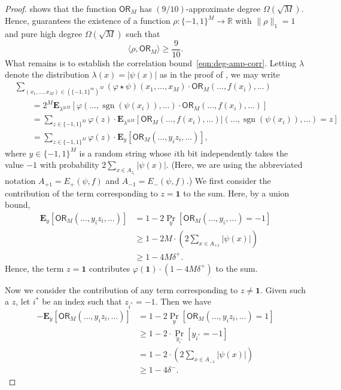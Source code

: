 \documentclass[11pt, letterpaper, fleqn]{article}
\theoremstyle{plain}
\newcommand{\R}{\mathbb{R}}
\newcommand{\sgn}{\mathrm{sign}}
\newcommand{\OR}{\mathsf{ OR}}
\newcommand{\bits}{\{-1,1\}}
\newcommand{\ls}{\star}
\renewcommand{\sgn}{\operatorname{sgn}}
\begin{document}
\begin{proof}

 shows that the function $\OR_M$ has $(9/10)$-approximate degree $\Omega(\sqrt{M})$. Hence,  guarantees the existence of a function $\rho : \bits^M \to \R$ with $\|\rho\|_1 = 1$ and pure high degree $\Omega(\sqrt{M})$ such that
\begin{equation}
\langle \rho, \OR_M \rangle \ge \frac{9}{10}.
\end{equation}
What remains is to establish the correlation bound~\eqref{eqn:deg-amp-corr}. Letting $\lambda$ denote the distribution $\lambda(x) = |\psi(x)|$ as in the proof of , we may write
\begin{align}
& \sum_{(x_1, \dots, x_{M}) \in (\bits^m)^M} (\varphi \ls \psi) (x_1, \dots, x_M) \cdot \OR_M(\dots, f(x_i), \dots) \nonumber \\
&\qquad= 2^{M} \mathbf{E}_{\lambda^{\otimes M}} [\varphi( \dots, \sgn(\psi(x_i)), \dots) \cdot \OR_M\left( \dots, f(x_i), \dots\right)] \nonumber\\
&\qquad= \sum_{z \in \bits^M} \varphi(z) \cdot \mathbf{E}_{\lambda^{\otimes M}} [\OR_M(\dots, f(x_i), \dots) | (\dots, \sgn(\psi(x_i)), \dots) = z] \nonumber\\
&\qquad = \sum_{z \in \bits^M} \varphi(z) \cdot \mathbf{E}_{y} [\OR_M(\dots, y_i z_i, \dots)], \label{eqn:deg-amp-middle}
\end{align}
where $y \in \bits^M$ is a random string whose $i$th bit independently takes the value $-1$ with probability $2 \sum_{x \in A_{z_i}} |\psi(x)|$. (Here, we are using the abbreviated notation $A_{+1} = E_+(\psi, f)$ and $A_{-1} = E_-(\psi, f)$.) We first consider the contribution of the term corresponding to $z = \mathbf{1}$ to the sum. Here, by a union bound,
\begin{align*}
\mathbf{E}_{y} [\OR_M(\dots, y_i z_i, \dots)] &= 1 - 2 \Pr_y[\OR_M(\dots, y_i, \dots) = -1] \\
&\ge 1 - 2 M \cdot \left(2 \sum_{x \in A_{+1}} |\psi(x)|\right) \\
&\ge 1 - 4 M\delta^+.
\end{align*}
Hence, the term $z = \mathbf{1}$ contributes $\varphi(\mathbf{1}) \cdot (1 - 4 M \delta^+)$ to the sum.

Now we consider the contribution of any term corresponding to $z \ne \mathbf{1}$. Given such a $z$, let $i^*$ be an index such that $z_{i^*} = -1$. Then we have
\begin{align*}
-\mathbf{E}_{y} [\OR_M(\dots, y_i z_i, \dots)] &= 1 - 2 \Pr_y[\OR_M(\dots, y_i z_i, \dots) = 1] \\
&\ge 1 - 2 \cdot \Pr_{y_{i^*}}[y_{i^*} = -1] \\
&= 1 - 2 \cdot \left(2 \sum_{x \in A_{-1}} |\psi(x)|\right) \\
&\ge 1 - 4 \delta^-.
\end{align*}


\end{proof}
\end{document}

